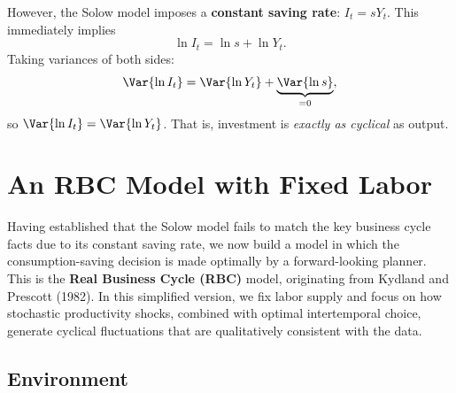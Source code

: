 However, the Solow model imposes a \textbf{constant saving rate}: $I_t = s Y_t$. This immediately implies
$$
\ln I_t = \ln s + \ln Y_t.
$$
Taking variances of both sides:
$$
\Var{\ln I_t} = \Var{\ln Y_t} + \underbrace{\Var{\ln s}}_{= 0},
$$
so $\Var{\ln I_t} = \Var{\ln Y_t}$. That is, investment is \textit{exactly as cyclical} as output.


\section{An RBC Model with Fixed Labor}

Having established that the Solow model fails to match the key business cycle facts due to its constant saving rate, we now build a model in which the consumption-saving decision is made optimally by a forward-looking planner. This is the \textbf{Real Business Cycle (RBC)} model, originating from Kydland and Prescott (1982). In this simplified version, we fix labor supply and focus on how stochastic productivity shocks, combined with optimal intertemporal choice, generate cyclical fluctuations that are qualitatively consistent with the data.

\subsection{Environment}


